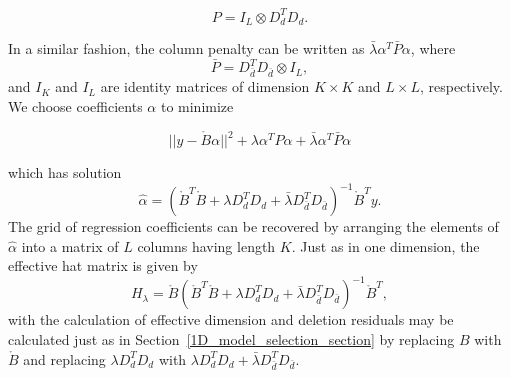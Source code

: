 \documentclass[12pt]{article}
\theoremstyle{definition}
\begin{document}
\[
P = I_L \otimes D_d^T D_d.
\]

In a similar fashion, the column penalty can be written as $\bar{\lambda} \alpha^T \bar{P} \alpha$, where
\[
\bar{P} = D_{\bar{d}}^T D_{\bar{d}} \otimes I_L, 
\]
and $I_K$ and $I_L$ are identity matrices of dimension  $K \times K$ and $L \times L$, respectively. We choose coefficients $\alpha$ to minimize

\begin{equation*}
\vert \vert y - \mathring{B} \alpha \vert \vert^2 + \lambda \alpha^T P \alpha + \bar{\lambda} \alpha^T \bar{P} \alpha
\end{equation*}

which has solution 
\[
\hat{\alpha} = \left(\mathring{B}^T \mathring{B} +  \lambda D_d^T D_d + \bar{\lambda} D_{\bar{d}}^T D_{\bar{d}} \right)^{-1} \mathring{B}^T y.
\]
\noindent
The grid of regression coefficients can be recovered by arranging the elements of $\hat{\alpha}$ into a matrix of $L$ columns having length $K$. Just as in one dimension, the effective hat matrix is given by 
\[
H_\lambda = \mathring{B}\left(\mathring{B}^T \mathring{B} +  \lambda D_d^TD_d + \bar{\lambda} D_{\bar{d}}^T D_{\bar{d}} \right)^{-1} \mathring{B}^T,
\]
with the calculation of effective dimension and deletion residuals may be calculated just as in Section~\ref{1D_model_selection_section} by replacing $B$ with $\mathring{B}$ and replacing $\lambda D_d^T D_d$ with $\lambda D_d^TD_d + \bar{\lambda} D_{\bar{d}}^T D_{\bar{d}}$.
\end{document}
